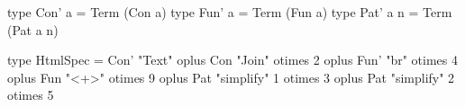 

\begin{code}
type Con' a    = Term  (Con a)
type Fun' a    = Term  (Fun a)
type Pat' a n  = Term  (Pat a n)
\end{code}


\begin{code}
type HtmlSpec
  =      Con'  "Text"
  oplus  Con   "Join"         otimes 2
  oplus  Fun'  "br"           otimes 4
  oplus  Fun   "<+>"          otimes 9
  oplus  Pat   "simplify"  1  otimes 3
  oplus  Pat   "simplify"  2  otimes 5
\end{code}